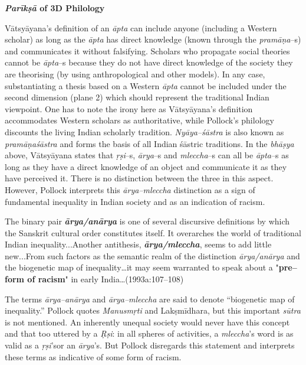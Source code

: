 \textbf{\textit{Parīkṣā} of 3D Philology}

Vātsyāyana’s definition of an \textit{āpta} can include anyone (including a Western scholar) as long as the \textit{āpta }has direct knowledge (known through the \textit{pramāṇa}–s) and communicates it without falsifying. Scholars who propagate social theories cannot be \textit{āpta}–s because they do not have direct knowledge of the society they are theorising (by using anthropological and other models). In any case, substantiating a thesis based on a Western \textit{āpta} cannot be included under the second dimension (plane 2) which should represent the traditional Indian viewpoint. One has to note the irony here as Vātsyāyana’s definition accommodates Western scholars as authoritative, while Pollock’s philology discounts the living Indian scholarly tradition. \textit{Nyāya–śāstra }is also known as \textit{pramāṇaśāstra }and forms the basis of all Indian śāstric traditions. In the \textit{bhāṣya} above, Vātsyāyana states that \textit{ṛṣi}–s, \textit{ārya}–s and \textit{mleccha}–s can all be \textit{āpta}–s as long as they have a direct knowledge of an object and communicate it as they have perceived it. There is no distinction between the three in this aspect. However, Pollock interprets this \textit{ārya–mleccha }distinction as a sign of fundamental inequality in Indian society and as an indication of racism.

\begin{myquote}
The binary pair \textit{\textbf{ārya/anārya}} is one of several discursive definitions by which the Sanskrit cultural order constitutes itself. It overarches the world of traditional Indian inequality...Another antithesis, \textit{\textbf{ā}\textbf{rya/mleccha}}, seems to add little new...From such factors as the semantic realm of the distinction \textit{ārya/anārya} and the biogenetic map of inequality…it may seem warranted to speak about a "\textbf{pre–form of racism}" in early India…(1993a:107–108)
\end{myquote}

The terms \textit{ārya–anārya} and \textit{ārya–mleccha} are said to denote “biogenetic map of inequality.” Pollock quotes \textit{Manusmṛti} and Lakṣmīdhara, but this important \textit{sūtra }is not mentioned. An inherently unequal society would never have this concept and that too uttered by a \textit{Ṛṣi}: in all spheres of activities, a \textit{mleccha}’s word is as valid as a \textit{ṛṣi}’sor an\textit{ ārya}’s. But Pollock disregards this statement and interprets these terms as indicative of some form of racism.

